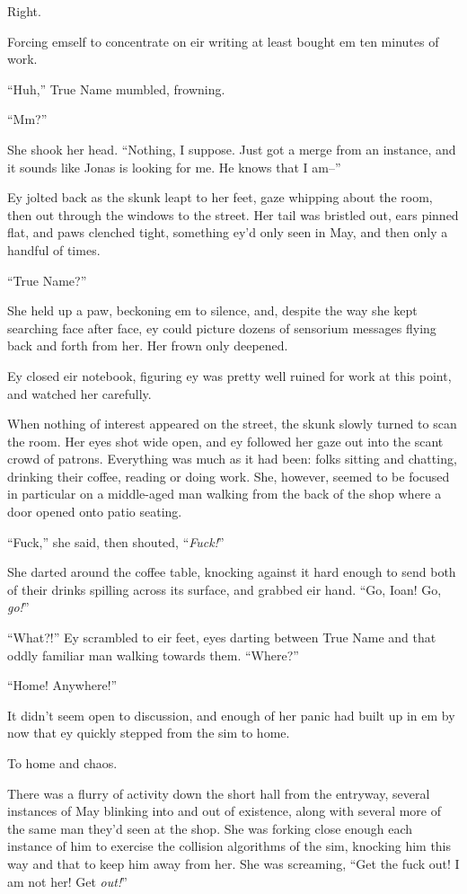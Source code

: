 Right.

Forcing emself to concentrate on eir writing at least bought em ten minutes of work.

``Huh,'' True Name mumbled, frowning.

``Mm?''

She shook her head. ``Nothing, I suppose. Just got a merge from an instance, and it sounds like Jonas is looking for me. He knows that I am--''

Ey jolted back as the skunk leapt to her feet, gaze whipping about the room, then out through the windows to the street. Her tail was bristled out, ears pinned flat, and paws clenched tight, something ey'd only seen in May, and then only a handful of times.

``True Name?''

She held up a paw, beckoning em to silence, and, despite the way she kept searching face after face, ey could picture dozens of sensorium messages flying back and forth from her. Her frown only deepened.

Ey closed eir notebook, figuring ey was pretty well ruined for work at this point, and watched her carefully.

When nothing of interest appeared on the street, the skunk slowly turned to scan the room. Her eyes shot wide open, and ey followed her gaze out into the scant crowd of patrons. Everything was much as it had been: folks sitting and chatting, drinking their coffee, reading or doing work. She, however, seemed to be focused in particular on a middle-aged man walking from the back of the shop where a door opened onto patio seating.

``Fuck,'' she said, then shouted, ``\emph{Fuck!}''

She darted around the coffee table, knocking against it hard enough to send both of their drinks spilling across its surface, and grabbed eir hand. ``Go, Ioan! Go, \emph{go!}''

``What?!'' Ey scrambled to eir feet, eyes darting between True Name and that oddly familiar man walking towards them. ``Where?''

``Home! Anywhere!''

It didn't seem open to discussion, and enough of her panic had built up in em by now that ey quickly stepped from the sim to home.

To home and chaos.

There was a flurry of activity down the short hall from the entryway, several instances of May blinking into and out of existence, along with several more of the same man they'd seen at the shop. She was forking close enough each instance of him to exercise the collision algorithms of the sim, knocking him this way and that to keep him away from her. She was screaming, ``Get the fuck out! I am not her! Get \emph{out!}''

